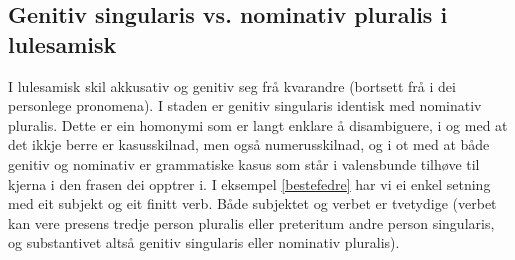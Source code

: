 \documentclass[a4paper,norsk]{article}
\begin{document}
% 
% 
% 
% 


\subsection{Genitiv singularis vs. nominativ pluralis i lulesamisk}

I lulesamisk skil akkusativ og genitiv seg frå kvarandre (bortsett frå i dei personlege pronomena). I staden er genitiv singularis identisk med nominativ pluralis. Dette er ein homonymi som er langt enklare å disambiguere, i og med at det ikkje berre er kasusskilnad, men også numerusskilnad, og i ot med at både genitiv og nominativ er  grammatiske kasus som står i valensbunde tilhøve til kjerna i den frasen dei opptrer i. I eksempel \ref{bestefedre} har vi ei enkel setning med eit subjekt og eit finitt verb. Både subjektet og verbet er tvetydige (verbet kan vere presens tredje person pluralis eller preteritum andre person singularis, og substantivet altså genitiv singularis eller nominativ pluralis). %
\end{document}
